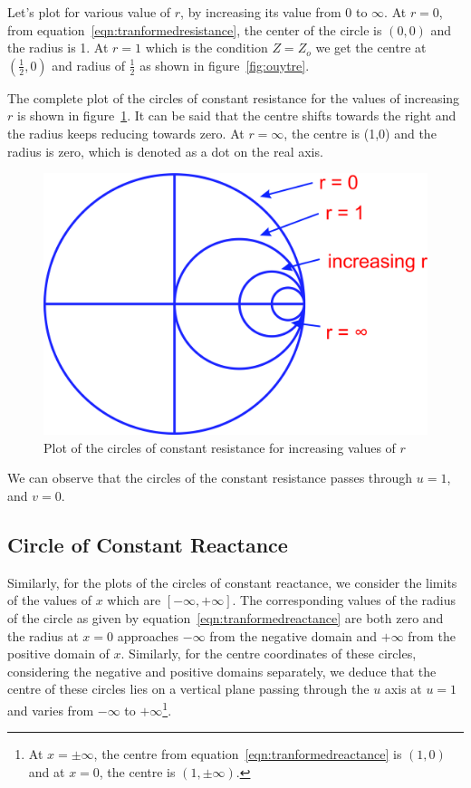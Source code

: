 Let's plot for various value of $r$, by increasing its value from 0 to $\infty$. At $r = 0$, from equation~\eqref{eqn:tranformedresistance}, the center of the circle is $(0,0)$ and the radius is 1. At $r = 1$ which is the condition $Z = Z_o$ we get the centre at $\left(\frac{1}{2}, 0\right)$ and radius of $\frac{1}{2}$ as shown in figure~\ref{fig:ouytre}.

The complete plot of the circles of constant resistance for the values of increasing $r$ is shown in figure~\ref{fig:rghmgfcx}. It can be said that the centre shifts towards the right and the radius keeps reducing towards zero. At $r = \infty$, the centre is (1,0) and the radius is zero, which is denoted as a dot on the real axis.
\begin{figure}[h]
\centering
\includegraphics[width=0.7\linewidth]{./graphics/rghmgfcx}
\caption{Plot of the circles of constant resistance for increasing values of $r$}
\label{fig:rghmgfcx}
\end{figure}

We can observe that the circles of the constant resistance passes through $u = 1$, and $v = 0$.

\subsection{Circle of Constant Reactance}
Similarly, for the plots of the circles of constant reactance, we consider the limits of the values of $x$ which are $[-\infty, +\infty]$. The corresponding values of the radius of the circle as given by equation~\eqref{eqn:tranformedreactance} are both zero and the radius at $x = 0$ approaches $-\infty$ from the negative domain and $+\infty$ from the positive domain of $x$. Similarly, for the centre coordinates of these circles, considering the negative and positive domains separately, we deduce that the centre of these circles lies on a vertical plane passing through the $u$ axis at $u = 1$ and varies from $-\infty$ to $+\infty$\footnote{
At $x = \pm\infty$, the centre from equation~\eqref{eqn:tranformedreactance} is $(1, 0)$ and at $x = 0$, the centre is $(1, \pm\infty)$.
}.

